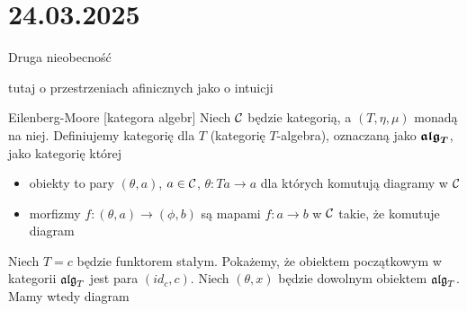 \section{24.03.2025}{Druga nieobecność}

tutaj o przestrzeniach afinicznych jako o intuicji

\begin{definition}{Eilenberg-Moore [kategora algebr]}{}
  Niech $\mathcal{C}$ będzie kategorią, a $(T,\eta,\mu)$ monadą na niej. Definiujemy kategorię  dla $T$ (kategorię $T$-algebra), oznaczaną jako $\boldsymbol{\mathfrak{alg}_T}$, jako kategorię której
  \begin{itemize}
    \item obiekty to pary $(\theta, a)$, $a\in\mathcal{C}$, $\theta:Ta\to a$ dla których komutują diagramy w $\mathcal{C}$
      \begin{center}
      \end{center}
    \item morfizmy $f:(\theta, a)\to (\phi, b)$ są mapami $f:a\to b$ w $\mathcal{C}$ takie, że komutuje diagram
      \begin{center}
      \end{center}
  \end{itemize}
\end{definition}

\begin{example}[m]
\item Niech $T=c$ będzie funktorem stałym. Pokażemy, że obiektem początkowym w kategorii $\mathfrak{alg}_T$ jest para $(id_c, c)$. Niech $(\theta, x)$ będzie dowolnym obiektem $\mathfrak{alg}_T$. Mamy wtedy diagram
  \begin{center}
  \end{center}
\end{example}

